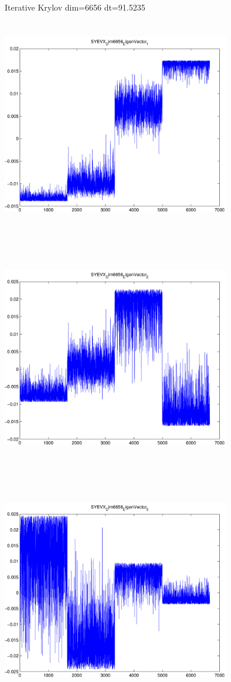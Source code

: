 \documentclass[9pt]{article}
\theoremstyle{plain}
\theoremstyle{definition}
\theoremstyle{remark}
\numberwithin{equation}{section}
\begin{document}
Iterative Krylov dim=6656 dt=91.5235
\includegraphics[width=10.0cm,height=10.0cm]{SYEVX_Dim6656_EigenVector_1.pdf}

\includegraphics[width=10.0cm,height=10.0cm]{SYEVX_Dim6656_EigenVector_2.pdf}

\includegraphics[width=10.0cm,height=10.0cm]{SYEVX_Dim6656_EigenVector_3.pdf}
\end{document}
